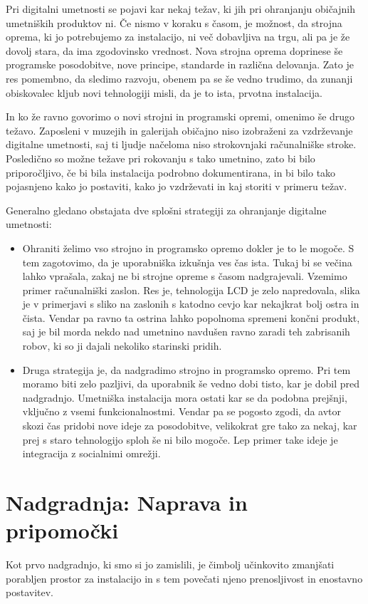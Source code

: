 Pri digitalni umetnosti se pojavi kar nekaj težav, ki jih pri ohranjanju
običajnih umetniških produktov ni. Če nismo v koraku s časom, je možnost, da
strojna oprema, ki jo potrebujemo za instalacijo, ni več dobavljiva na trgu,
ali pa je že dovolj stara, da ima zgodovinsko vrednost. Nova strojna
oprema doprinese še programske posodobitve, nove principe, standarde in različna
delovanja. Zato je res pomembno, da sledimo razvoju, obenem pa
se še vedno trudimo, da zunanji obiskovalec kljub novi tehnologiji misli, da je to ista, prvotna instalacija.

In ko že ravno govorimo o novi strojni in programski opremi, omenimo še drugo težavo. Zaposleni v muzejih in galerijah običajno niso izobraženi za vzdrževanje digitalne umetnosti, saj ti ljudje načeloma niso strokovnjaki računalniške stroke. Posledično so možne težave pri rokovanju s tako umetnino, zato bi bilo priporočljivo, če bi bila instalacija podrobno dokumentirana, in bi bilo tako pojasnjeno kako jo postaviti, kako jo vzdrževati in kaj storiti v primeru težav.

Generalno gledano obstajata dve splošni strategiji za ohranjanje digitalne umetnosti:
\begin{itemize}
\item
Ohraniti želimo vso strojno in programsko opremo dokler je  to le mogoče. S tem
zagotovimo, da je uporabniška izkušnja ves čas ista. Tukaj bi se večina lahko vprašala, zakaj ne bi strojne opreme s časom nadgrajevali. Vzemimo primer računalniški
zaslon. Res je, tehnologija LCD je zelo napredovala, slika je v primerjavi s sliko na zaslonih s katodno cevjo kar nekajkrat bolj ostra in čista. Vendar pa ravno ta
ostrina lahko popolnoma spremeni končni produkt, saj je bil morda nekdo nad umetnino navdušen ravno zaradi teh zabrisanih robov, ki so ji dajali nekoliko starinski pridih.

\item
Druga strategija je, da nadgradimo strojno in programsko opremo. Pri tem moramo biti zelo pazljivi, da uporabnik še vedno dobi tisto, kar je dobil pred nadgradnjo. Umetniška instalacija mora ostati kar se da podobna prejšnji, vključno z vsemi funkcionalnostmi. Vendar pa se pogosto zgodi, da avtor skozi čas pridobi nove ideje za posodobitve, velikokrat gre tako za nekaj, kar prej s staro tehnologijo sploh še ni bilo mogoče. Lep primer take ideje je integracija z socialnimi omrežji.
\end{itemize}


\chapter{Nadgradnja: Naprava in pripomočki}
Kot prvo nadgradnjo, ki smo si jo zamislili, je čimbolj učinkovito zmanjšati
porabljen prostor za instalacijo in s tem povečati njeno prenosljivost in
enostavno postavitev.

